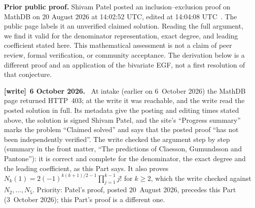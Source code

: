 \documentclass[11pt,letterpaper]{article}
\numberwithin{equation}{section}
\theoremstyle{remark}\newtheorem{remark}[theorem]{Remark}
\newenvironment{writenote}[1][]{\par\smallskip\begingroup\small
 \noindent\textbf{[write]}\if\relax\detokenize{#1}\relax\else~\textbf{#1.}\fi\ }%
 {\par\endgroup\smallskip}
\begin{document}
\noindent\textbf{Prior public proof.}
Shivam Patel posted an inclusion--exclusion proof on MathDB on
20 August 2026 at 14:02:52 UTC, edited at 14:04:08 UTC~\cite{patel}.
The public page labels it an unverified claimed solution. Reading the
full argument, we find it valid for the denominator representation,
exact degree, and leading coefficient stated here. This mathematical
assessment is not a claim of peer review, formal verification, or
community acceptance. The derivation below is a different proof and an
application of the bivariate EGF, not a first resolution of that conjecture.
\begin{writenote}[6 October 2026]
At intake (earlier on 6~October 2026) the MathDB page returned HTTP~403; at the write it was reachable, and the write read the posted solution in full. Its metadata give the posting and editing times stated above, the solution is signed Shivam Patel, and the site's ``Progress summary'' marks the problem ``Claimed solved'' and says that the posted proof ``has not been independently verified''. The write checked the argument step by step (summary in the front matter, ``The predictions of Claesson, Gu\dh mundsson and Pantone''): it is correct and complete for the denominator, the exact degree and the leading coefficient, as this Part says. It also proves $N_k(1)=2(-1)^{k(k+1)/2-1}\prod_{j=1}^{k-1}j!$ for $k\ge2$, which the write checked against $N_2,\dots,N_5$. Priority: Patel's proof, posted 20~August 2026, precedes this Part (3~October 2026); this Part's proof is a different one.
\end{writenote}
\end{document}
